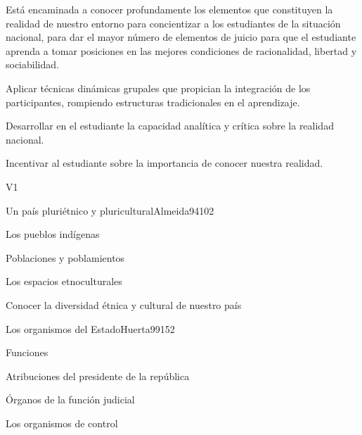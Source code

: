 \begin{syllabus}


\begin{justification}
Está encaminada a conocer profundamente los elementos que constituyen la realidad de 
nuestro entorno para concientizar a los estudiantes de la situación nacional, 
para dar el mayor número de elementos de juicio para que el estudiante aprenda a tomar 
posiciones en las mejores condiciones de racionalidad, libertad y sociabilidad.
\end{justification}

\begin{goals}
\item Aplicar técnicas dinámicas grupales que propician la integración de los participantes, rompiendo estructuras tradicionales en el aprendizaje.
\item Desarrollar en el estudiante la capacidad analítica y crítica sobre la realidad nacional.
\item Incentivar al estudiante sobre la importancia de conocer nuestra realidad.
\end{goals}

\begin{outcomes}{V1}
      \item {}
\end{outcomes}

\begin{unit}{Un país pluriétnico y pluricultural}{Almeida94}{10}{2}
   \begin{topics}
	\item Los pueblos indígenas
	\item Poblaciones y poblamientos
	\item Los espacios etnoculturales
   \end{topics}

   \begin{learningoutcomes}
      \item Conocer la diversidad étnica y cultural de nuestro país
   \end{learningoutcomes}
\end{unit}

\begin{unit}{Los organismos del Estado}{Huerta99}{15}{2}
   \begin{topics}
      \item Funciones
	\item Atribuciones del presidente de la república
	\item Órganos de la función judicial
	\item Los organismos de control
  \end{topics}


\end{unit}
\end{syllabus}

